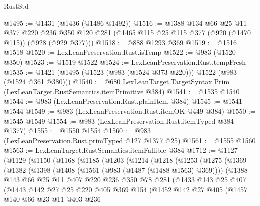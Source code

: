 \begin{lexlean}{RustStd}
\begin{coremodule}
{\begin{coremodule}
{{{{{{@1495 := @1431 (@1436 (@1486 @1492))
@1516 := @1388
    @134
    @66
    @25
    @11
    @377
    @220
    @236
    @350
    @120
    @281
    (@1465 @115 @25 @115 @377 (@920 (@1470 @115)) (@928 (@929 @377)))
@1518 := @888 @1293 @369
@1519 := @1516 @1518
@1520 := LexLeanPreservation.Rust.isTemp
@1522 := @983 (@1520 @350)
@1523 := @1519 @1522
@1524 := LexLeanPreservation.Rust.tempFresh
@1535 := @1421 (@1495 (@1523 (@983 (@1524 @373 @220))) @1522 (@983 (@1524 @361 @380)))
@1540 := @680 LexLeanTarget.TargetSyntax.Prim (LexLeanTarget.RustSemantics.itemPrimitive @384)
@1541 := @1535 @1540
@1544 := @983 (LexLeanPreservation.Rust.plainItem @384)
@1545 := @1541 @1544
@1549 := @983 (LexLeanPreservation.Rust.itemOK @449 @384)
@1550 := @1545 @1549
@1554 := @983 (LexLeanPreservation.Rust.itemTyped @384 @1377)
@1555 := @1550 @1554
@1560 := @983 (LexLeanPreservation.Rust.primTyped @127 @1377 @25)
@1561 := @1555 @1560
@1563 := LexLeanTarget.RustSemantics.itemFallible @384
@1712 := @1127
    (@1129
      (@1150
        (@1168
          (@1185
            (@1203
              (@1214
                (@1218
                  (@1253
                    (@1275
                      (@1369
                        (@1382
                          (@1398
                            (@1408 (@1561 (@983 (@1487 (@1488 @1563) @369))))
                            (@1388
                              @143
                              @66
                              @25
                              @11
                              @407
                              @220
                              @236
                              @350
                              @78
                              @281
                              (@1433
                                @143
                                @25
                                @407
                                (@1443
                                  @142
                                  @27
                                  @25
                                  @220
                                  @405
                                  @369
                                  @154
                                  (@1452
                                    @142
                                    @27
                                    @405
                                    (@1457
                                      @140
                                      @66
                                      @23
                                      @11
                                      @403
                                      @236
}}}}}}
\end{coremodule}}
\end{coremodule}
\end{lexlean}
